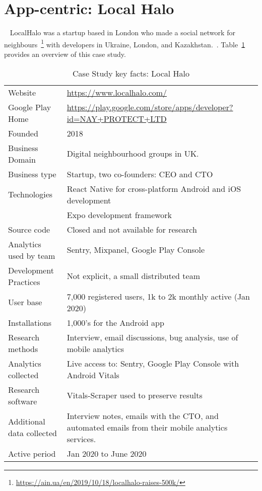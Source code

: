 \clearpage


\section{App-centric: Local Halo}~\label{study-localhalo}
LocalHalo was a startup based in London who made a social network for neighbours~\footnote{\url{https://ain.ua/en/2019/10/18/localhalo-raises-500k/}} with developers in Ukraine, London, and Kazakhstan.~\citep{karpenko2019_localhalo_a_social_network_for_neighbors}. 
Table~\ref{tab:local_halo_anaytics_overview} provides an overview of this case study.

{\renewcommand{\arraystretch}{0.8}%
\begin{table}[htbp!]
    \centering
    \small
    \setlength{\tabcolsep}{1pt}
    \begin{tabular}{lp{11cm}}
       \toprule
       Website &\url{https://www.localhalo.com/} \\
       Google Play Home & \url{https://play.google.com/store/apps/developer?id=NAY+PROTECT+LTD} \\
       Founded &2018 \\
       Business Domain &Digital neighbourhood groups in UK.\\
       Business type &Startup, two co-founders: CEO and CTO \\
       Technologies  &React Native for cross-platform Android and iOS development \\
       &Expo development framework \\
       Source code  &Closed and not available for research \\
       Analytics used by team &Sentry, Mixpanel, Google Play Console \\
       Development Practices &Not explicit, a small distributed team \\
       \midrule
       User base &7,000 registered users, 1k to 2k monthly active (Jan 2020) \\
       Installations &1,000's for the Android app \\
       \midrule
       Research methods &Interview, email discussions, bug analysis, use of mobile analytics \\
       Analytics collected &Live access to: Sentry, Google Play Console with Android Vitals \\
       Research software &Vitals-Scraper used to preserve results \\
       Additional data collected &Interview notes, emails with the CTO, and automated emails from their mobile analytics services. \\
       Active period &Jan 2020 to June 2020 \\
       \bottomrule
    \end{tabular}
    \caption{Case Study key facts: Local Halo}
    \label{tab:local_halo_anaytics_overview}
\end{table}
}

